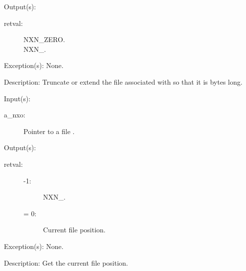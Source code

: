 \begin{capi}
\begin{capilist}
\begin{description}
		\end{description}
	\item[Output(s): ]
		\begin{description}\item[]
		\item[retval: ]
			\begin{description}\item[]
			\item[NXN\_ZERO.]
			\item[NXN\_.]
			\end{description}
		\end{description}
	\item[Exception(s): ] None.
	\item[Description: ]
		Truncate or extend the file associated with  so
		that it is  bytes long.
	\end{capilist}
\label{nxo_file_position_get}
	\begin{capilist}
	\item[Input(s): ]
		\begin{description}\item[]
		\item[a\_nxo: ]
			Pointer to a file .
		\end{description}
	\item[Output(s): ]
		\begin{description}\item[]
		\item[retval: ]
			\begin{description}\item[]
			\item[-1: ]
				NXN\_.
			\item[{\gt}= 0: ]
				Current file position.
			\end{description}\item[]
		\end{description}
	\item[Exception(s): ] None.
	\item[Description: ]
		Get the current file position.
	\end{capilist}
\label{nxo_file_position_set}

\end{capi}

